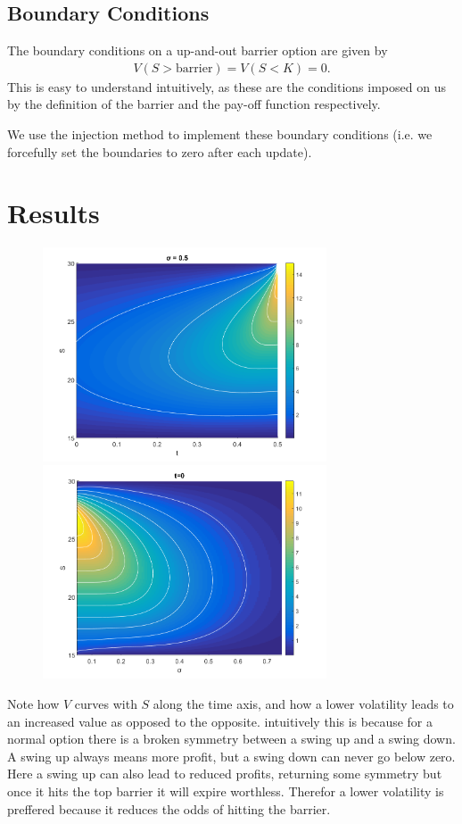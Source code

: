  \subsection{Boundary Conditions}
  The boundary conditions on a up-and-out barrier option are given by
  \begin{align}
    V(S > \text{barrier}) = V(S < K) = 0.
  \end{align}
  This is easy to understand intuitively, as these are the conditions imposed on us by the definition of the barrier and the pay-off function respectively.

  We use the injection method to implement these boundary conditions (i.e. we forcefully set the boundaries to zero after each update).
\section{Results}
\begin{figure}[h!]
  \caption{}
  \centering
    \includegraphics[width=0.75\textwidth]{plots/field}
    \includegraphics[width=0.75\textwidth]{plots/sigma_field}
\end{figure}
Note how $V$ curves with $S$ along the time axis, and how a lower volatility leads to an increased value as opposed to the opposite.
intuitively this is because for a normal option there is a broken symmetry between a swing up and a swing down. A swing up always means more profit, but a swing down can never go below zero.
Here a swing up can also lead to reduced profits, returning some symmetry but once it hits the top barrier it will expire worthless. Therefor a lower volatility is preffered because it reduces the odds
of hitting the barrier.
